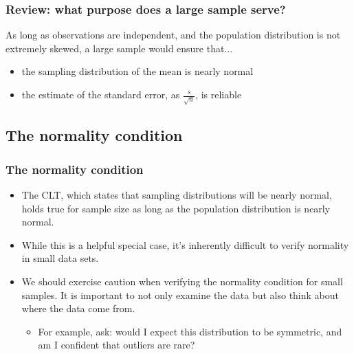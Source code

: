 
\begin{frame}
\frametitle{Review: what purpose does a large sample serve?}

As long as observations are independent, and the population distribution is not extremely skewed, a large sample would ensure that...

\begin{itemize}

\item the sampling distribution of the mean is nearly normal

\item the estimate of the standard error, as $\frac{s}{\sqrt{n}}$, is reliable

\end{itemize}

\end{frame}


\subsection{The normality condition}


\begin{frame}
\frametitle{The normality condition}

\begin{itemize}

\item The CLT, which states that sampling distributions will be nearly normal, holds true for  sample size as long as the population distribution is nearly normal.

\pause

\item While this is a helpful special case, it's inherently difficult to verify normality in small data sets.

\pause

\item We should exercise caution when verifying the normality condition for small samples. It is important to not only examine the data but also think about where the data come from. 
\begin{itemize}
\item For example, ask: would I expect this distribution to be symmetric, and am I confident that outliers are rare?
\end{itemize}

\end{itemize}

\end{frame}

